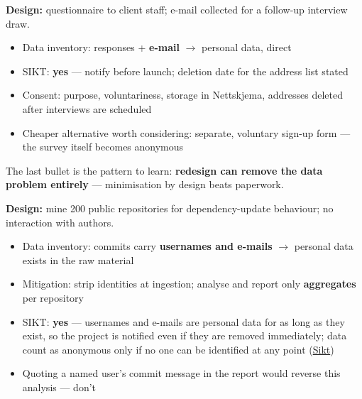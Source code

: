 \documentclass[11pt,a4paper,british,twoside=false,headings=small,chapterprefix=false,numbers=noenddot]{scrbook}
\begin{document}
\begin{center}\small
\small
  \textbf{Design:} questionnaire to client staff; e-mail collected for a
  follow-up interview draw.
  \begin{itemize}\setlength{\itemsep}{0.35em}
    \item Data inventory: responses + \textbf{e-mail} $\rightarrow$ personal
          data, direct
    \item SIKT: \textbf{yes} --- notify before launch; deletion date for the
          address list stated
    \item Consent: purpose, voluntariness, storage in Nettskjema, addresses
          deleted after interviews are scheduled
    \item Cheaper alternative worth considering: separate, voluntary sign-up
          form --- the survey itself becomes anonymous
  \end{itemize}
  
  The last bullet is the pattern to learn: \textbf{redesign can remove the
  data problem entirely} --- minimisation by design beats paperwork.
\end{center}

\begin{center}\small
\small
  \textbf{Design:} mine 200 public repositories for dependency-update
  behaviour; no interaction with authors.
  \begin{itemize}\setlength{\itemsep}{0.35em}
    \item Data inventory: commits carry \textbf{usernames and e-mails}
          $\rightarrow$ personal data exists in the raw material
    \item Mitigation: strip identities at ingestion; analyse and report only
          \textbf{aggregates} per repository
    \item SIKT: \textbf{yes} --- usernames and e-mails are personal data
          for as long as they exist, so the project is notified even if they
          are removed immediately; data count as anonymous only if no one can
          be identified at any point (\href{https://sikt.no/en/node/153}{Sikt})
    \item Quoting a named user's commit message in the report would reverse
          this analysis --- don't
  \end{itemize}
\end{center}
\end{document}
